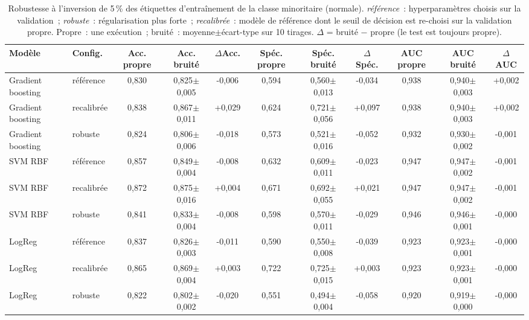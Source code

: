 \begin{table}[t]
\centering
\small
\caption{Robustesse à l'inversion de 5\,\% des étiquettes d'entraînement de la classe minoritaire (normale). \emph{référence}~: hyperparamètres choisis sur la validation~; \emph{robuste}~: régularisation plus forte~; \emph{recalibrée}~: modèle de référence dont le seuil de décision est re-choisi sur la validation propre. Propre~: une exécution~; bruité~: moyenne$\pm$écart-type sur 10 tirages. $\Delta$ = bruité $-$ propre (le test est toujours propre).}
\label{tab:noise5}
\begin{adjustbox}{max width=\textwidth}
\begin{tabular}{llccccccccc}
\toprule
Modèle & Config. & Acc. propre & Acc. bruité & $\Delta$Acc. & Spéc. propre & Spéc. bruité & $\Delta$Spéc. & AUC propre & AUC bruité & $\Delta$AUC \\
\midrule
Gradient boosting & référence & 0,830 & 0,825$\pm$0,005 & -0,006 & 0,594 & 0,560$\pm$0,013 & -0,034 & 0,938 & 0,940$\pm$0,003 & +0,002 \\
Gradient boosting & recalibrée & 0,838 & 0,867$\pm$0,011 & +0,029 & 0,624 & 0,721$\pm$0,056 & +0,097 & 0,938 & 0,940$\pm$0,003 & +0,002 \\
Gradient boosting & robuste & 0,824 & 0,806$\pm$0,006 & -0,018 & 0,573 & 0,521$\pm$0,016 & -0,052 & 0,932 & 0,930$\pm$0,002 & -0,001 \\
SVM RBF & référence & 0,857 & 0,849$\pm$0,004 & -0,008 & 0,632 & 0,609$\pm$0,011 & -0,023 & 0,947 & 0,947$\pm$0,002 & -0,001 \\
SVM RBF & recalibrée & 0,872 & 0,875$\pm$0,016 & +0,004 & 0,671 & 0,692$\pm$0,055 & +0,021 & 0,947 & 0,947$\pm$0,002 & -0,001 \\
SVM RBF & robuste & 0,841 & 0,833$\pm$0,004 & -0,008 & 0,598 & 0,570$\pm$0,011 & -0,029 & 0,946 & 0,946$\pm$0,001 & -0,000 \\
LogReg & référence & 0,837 & 0,826$\pm$0,003 & -0,011 & 0,590 & 0,550$\pm$0,008 & -0,039 & 0,923 & 0,923$\pm$0,001 & -0,000 \\
LogReg & recalibrée & 0,865 & 0,869$\pm$0,004 & +0,003 & 0,722 & 0,725$\pm$0,015 & +0,003 & 0,923 & 0,923$\pm$0,001 & -0,000 \\
LogReg & robuste & 0,822 & 0,802$\pm$0,002 & -0,020 & 0,551 & 0,494$\pm$0,004 & -0,058 & 0,920 & 0,919$\pm$0,000 & -0,000 \\
\bottomrule
\end{tabular}
\end{adjustbox}
\end{table}
